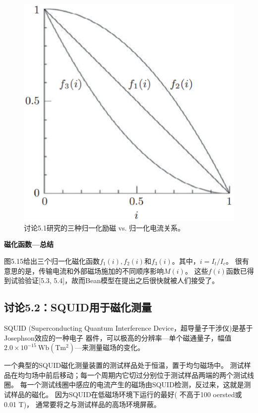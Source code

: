 \begin{figure}[htbp]
	\centering
	\includegraphics[scale=0.6]{chpt5/figs/fig5.15.eps}
	\caption{讨论5.1研究的三种归一化励磁 vs. 归一化电流关系。}
\end{figure}

\textbf{磁化函数---总结}

图5.15给出三个归一化磁化函数$f_1(i), f_2(i)$和$f_3(i)$。其中，$i = I_t/I_c$。
很有意思的是，传输电流和外部磁场施加的不同顺序影响$M(i)$。
这些$f(i)$函数已得到试验验证[5.3, 5.4]，故而Bean模型在提出之后很快就被人们接受了。


\subsection{讨论5.2：SQUID用于磁化测量}
SQUID (Superconducting Quantum Interference Device，超导量子干涉仪)是基于Josephson效应的一种电子
器件，可以极高的分辨率---单个磁通量子，幅值$2.0\times 10^{−15}\ \mathrm{Wb(Tm^2)}$---来测量磁场的变化。

一个典型的SQUID磁化测量装置的测试样品处于恒温，置于均匀磁场中。
测试样品在均匀场中前后移动；每一个周期内它切过分别位于测试样品两端的两个测试线圈。
每一个测试线圈中感应的电流产生的磁场由SQUID检测，反过来，这就是测试样品的磁化。
因为SQUID在低磁场环境下运行的最好( 不高于100 oersted或0.01 T)，
通常要将之与测试样品的高场环境屏蔽。


